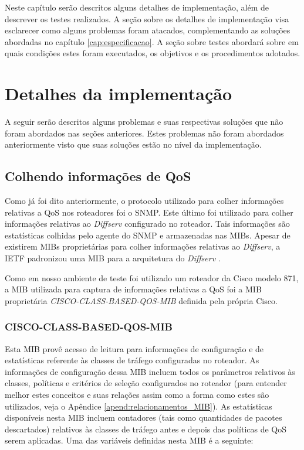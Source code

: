 \acresetall
	
	Neste capítulo serão descritos alguns detalhes de implementação, além de descrever os testes realizados. A seção sobre os detalhes de implementação visa esclarecer como alguns problemas foram atacados, complementando as soluções abordadas no capítulo \ref{cap:especificacao}. A seção sobre testes abordará sobre em quais condições estes foram executados, os objetivos e os procedimentos adotados.

\section{Detalhes da implementação}

	A seguir serão descritos alguns problemas e suas respectivas soluções que não foram abordados nas seções anteriores. Estes problemas não foram abordados anteriormente visto que suas soluções estão no nível da implementação.
	
\subsection{Colhendo informações de QoS}
	
	Como já foi dito anteriormente, o protocolo utilizado para colher informações relativas a QoS nos roteadores foi o SNMP. Este último foi utilizado para colher informações relativas ao \textit{Diffserv} configurado no roteador. Tais informações são estatísticas colhidas pelo agente do SNMP e armazenadas nas MIBs. Apesar de existirem MIBs proprietárias para colher informações relativas ao \textit{Diffserv}, a IETF padronizou uma MIB para a arquitetura do \textit{Diffserv} \cite{BCS02}.
	
	Como em nosso ambiente de teste foi utilizado um roteador da Cisco modelo 871, a MIB utilizada para captura de informações relativas a QoS foi a MIB proprietária \textit{CISCO-CLASS-BASED-QOS-MIB} \cite{MIBCISCO08} definida pela própria Cisco.
	
\subsubsection{CISCO-CLASS-BASED-QOS-MIB}
		
		Esta MIB provê acesso de leitura para informações de configuração e de estatísticas referente às classes de tráfego configuradas no roteador. As informações de configuração dessa MIB incluem todos os parâmetros relativos às classes, políticas e critérios de seleção configurados no roteador (para entender melhor estes conceitos e suas relações assim como a forma como estes são utilizados, veja o Apêndice \ref{apend:relacionamentos_MIB}). As estatísticas disponíveis nesta MIB incluem contadores (tais como quantidades de pacotes descartados) relativos às classes de tráfego antes e depois das políticas de QoS serem aplicadas. Uma das variáveis definidas nesta MIB é a seguinte:
		
